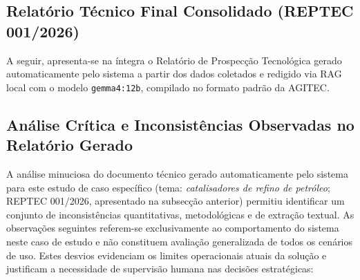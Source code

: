 \documentclass[12pt, a4paper]{article}
\begin{document}
  \subsection{Relatório Técnico Final Consolidado (REPTEC 001/2026)}

  A seguir, apresenta-se na íntegra o Relatório de Prospecção Tecnológica gerado automaticamente pelo sistema a partir dos dados coletados e redigido via RAG local com o modelo \texttt{gemma4:12b}, compilado no formato padrão da AGITEC.

\newpage


\subsection{Análise Crítica e Inconsistências Observadas no Relatório Gerado}
  \label{sec:inconsistencias-caso-estudo}

  A análise minuciosa do documento técnico gerado automaticamente pelo sistema para este estudo de caso específico (tema: \textit{catalisadores de refino de petróleo}; REPTEC 001/2026, apresentado na subsecção anterior) permitiu identificar um conjunto de inconsistências quantitativas, metodológicas e de extração textual. As observações seguintes referem-se exclusivamente ao comportamento do sistema neste caso de estudo e não constituem avaliação generalizada de todos os cenários de uso. Estes desvios evidenciam os limites operacionais atuais da solução e justificam a necessidade de supervisão humana nas decisões estratégicas:
\end{document}
